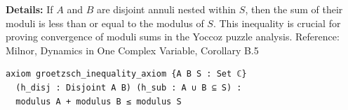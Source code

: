 \textbf{Details:} If $A$ and $B$ are disjoint annuli nested within $S$, then the sum of their moduli is less than or equal to the modulus of $S$.
This inequality is crucial for proving convergence of moduli sums in the Yoccoz puzzle analysis.
Reference: Milnor, Dynamics in One Complex Variable, Corollary B.5

\begin{lstlisting}[language=Lean]
axiom groetzsch_inequality_axiom {A B S : Set ℂ}
  (h_disj : Disjoint A B) (h_sub : A ∪ B ⊆ S) :
  modulus A + modulus B ≤ modulus S
\end{lstlisting}

